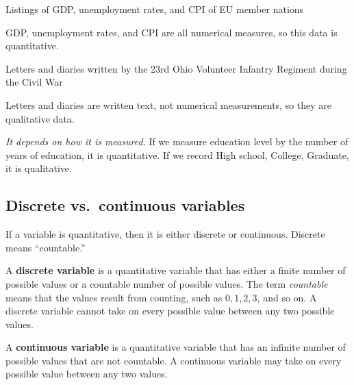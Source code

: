 \documentclass{ximera}
\begin{document}
\begin{problem}
\begin{question}
Listings of GDP, unemployment rates, and CPI of EU member nations
\begin{multipleChoice}
\end{multipleChoice}
\begin{explanation}
GDP, unemployment rates, and CPI are all numerical measures, so this data is quantitative.
\end{explanation}
\end{question}

\begin{question}
Letters and diaries written by the 23rd Ohio Volunteer Infantry Regiment during the Civil War
\begin{multipleChoice}
\end{multipleChoice}
\begin{explanation}
Letters and diaries are written text, not numerical measurements, so they are qualitative data.
\end{explanation}
\end{question}
\end{problem}

\begin{example}
\emph{It depends on how it is measured.} If we measure education level by the number of years of education, it is quantitative. If we record High school, College, Graduate, it is qualitative.
\end{example}

\subsection*{Discrete vs.\ continuous variables}

If a variable is quantitative, then it is either discrete or continuous. Discrete means ``countable.''

\begin{definition}
A \textbf{discrete variable} is a quantitative variable that has either a finite number of possible values or a countable number of possible values. The term \emph{countable} means that the values result from counting, such as $0, 1, 2, 3$, and so on. A discrete variable cannot take on every possible value between any two possible values.

A \textbf{continuous variable} is a quantitative variable that has an infinite number of possible values that are not countable. A continuous variable may take on every possible value between any two values.
\end{definition}
\end{document}
